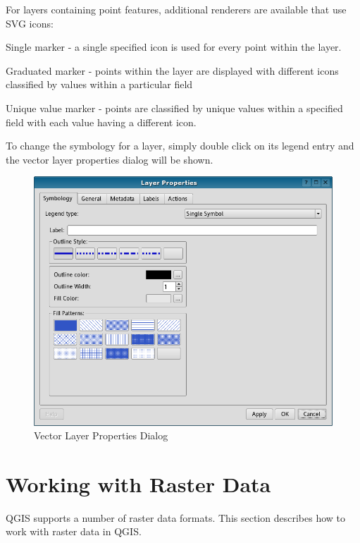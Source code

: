 \documentclass[10pt,english]{article}
\begin{document}
\begin{onehalfspace}
For layers containing point features, additional renderers are
available that use SVG icons:

\begin{compactdesc}
    \item[Single marker] - a single specified icon is used for
    every point within the layer.
    \item[Graduated marker] - points within the layer are
    displayed with different icons classified by values within a
    particular field
    \item[Unique value marker] - points are classified by unique
    values within a specified field with each value having a
    different icon.
\end{compactdesc}

To change the symbology for a layer, simply double click on its legend entry and the vector layer properties dialog will be shown.

\begin{figure}[h]
   \begin{center}
   \caption{Vector Layer Properties Dialog}\label{fig:vector_symbology}\smallskip
   \includegraphics[scale=.5]{qgis_user_guide_images/vectorLayerSymbology.png}  
\end{center}  
\end{figure}
\afterpage{\clearpage}

\section{Working with Raster Data}
QGIS supports a number of raster data formats. This section describes how to work with raster data in QGIS.

\end{onehalfspace}
\end{document}
